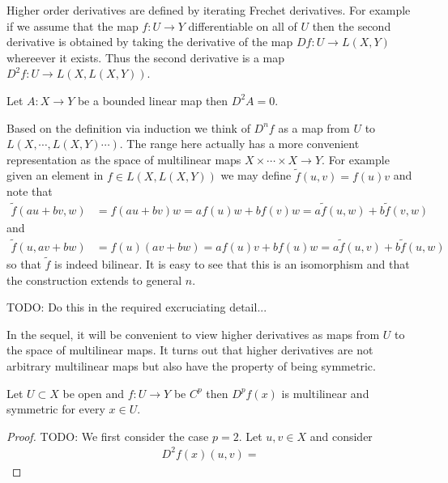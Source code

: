 Higher order derivatives are defined by iterating Frechet derivatives.  For
example if we assume that the map $f : U \to Y$ differentiable on all
of $U$ then the second derivative is obtained by
taking the derivative of the map $Df : U \to L(X,Y)$ whereever it
exists.  Thus the second derivative is a map $D^2f : U \to
L(X,L(X,Y))$.  

\begin{examp}Let $A : X \to Y$ be a bounded linear map then $D^2A = 0$.
\end{examp}

Based on the definition via induction we think of $D^nf$ as a map from
$U$ to $L(X, \dotsb ,L(X, Y) \dotsb)$.  The range here actually has a
more convenient representation as the space of multilinear maps $X
\times \dotsm \times X \to Y$.  For example given an element in $f \in
L(X,L(X,Y))$ we may define $\tilde{f}(u,v) = f(u) v$ and note that
\begin{align*}
\tilde{f}(au + bv, w) &= f(au + bv) w = a f(u) w + b f(v) w = a
\tilde{f}(u,w) + b \tilde{f}(v,w)
\end{align*} and 
\begin{align*}
\tilde{f}(u, av + bw) &= f(u)(av+bw) = a f(u) v + b f(u) w = a
                        \tilde{f}(u,v) + b\tilde{f}(u,w)
\end{align*}
so that $\tilde{f}$ is indeed bilinear.  It is easy to see that this
is an isomorphism and that the construction extends to general $n$.

TODO: Do this in the required excruciating detail...

In the sequel, it will be convenient to view higher derivatives as maps
from $U$ to the space of multilinear maps.  It turns out that higher
derivatives are not arbitrary multilinear maps but also have the
property of being symmetric.
\begin{prop}Let $U \subset X$ be open and $f : U \to Y$ be $C^p$ then
  $D^pf(x)$ is multilinear and symmetric for every $x \in U$.
\end{prop}
\begin{proof}
TODO:
We first consider the case $p=2$.  Let $u,v \in X$ and consider
\begin{align*}
D^2f(x) (u,v) = 
\end{align*}
\end{proof}

